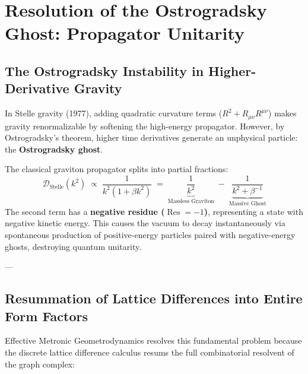 \documentclass[
    12pt,
    a4paper,
    headings=normal,
    twoside=false,
    open=any,
    parskip=half
]{scrbook}
\DeclareMathOperator{\Res}{Res}
\begin{document}
\section{Resolution of the Ostrogradsky Ghost: Propagator Unitarity}
\label{sec:ch1_ostrogradsky_ghost}

\subsection{The Ostrogradsky Instability in Higher-Derivative Gravity}

In Stelle gravity (1977), adding quadratic curvature terms ($R^2 + R_{\mu\nu}R^{\mu\nu}$) makes gravity renormalizable by softening the high-energy propagator. However, by Ostrogradsky's theorem, higher time derivatives generate an unphysical particle: the \textbf{Ostrogradsky ghost}.

The classical graviton propagator splits into partial fractions:
\begin{equation}
\mathcal{D}_{\text{Stelle}}(k^2) \;\propto\; \frac{1}{k^2 (1 + \beta k^2)} \;=\; \underbrace{\frac{1}{k^2}}_{\text{Massless Graviton}} \;-\; \underbrace{\frac{1}{k^2 + \beta^{-1}}}_{\text{Massive Ghost}}
\label{eq:ch1_stelle_ghost_propagator}
\end{equation}
The second term has a \textbf{negative residue ($\Res = -1$)}, representing a state with negative kinetic energy. This causes the vacuum to decay instantaneously via spontaneous production of positive-energy particles paired with negative-energy ghosts, destroying quantum unitarity.

---

\subsection{Resummation of Lattice Differences into Entire Form Factors}

Effective Metronic Geometrodynamics resolves this fundamental problem because the discrete lattice difference calculus resums the full combinatorial resolvent of the graph complex:
\end{document}

